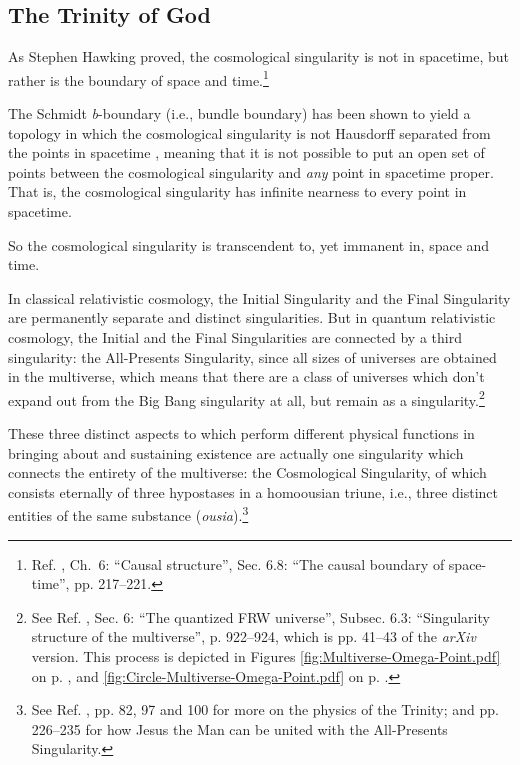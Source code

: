\documentclass[letterpaper,12pt]{article}
\begin{document}
\subsection{The Trinity of God}
\label{subsec:TrinityOfGod}

As Stephen Hawking proved, the cosmological singularity is not in spacetime, but rather is the boundary of space and time.\footnote{Ref. , Ch.~6: ``Causal structure'', Sec. 6.8: ``The causal boundary of space-time'', pp. 217--221.}

The Schmidt \emph{b}-boundary (i.e., bundle boundary) has been shown to yield a topology in which the cosmological singularity is not Hausdorff separated from the points in spacetime \cite{Bosshard1976,HajicekSchmidt1971,Johnson1977,Johnson1979,Schmidt1971,Schmidt1973,Schmidt1977,Schmidt1979}, meaning that it is not possible to put an open set of points between the cosmological singularity and \emph{any} point in spacetime proper. That is, the cosmological singularity has infinite nearness to every point in spacetime.

So the cosmological singularity is transcendent to, yet immanent in, space and time.

In classical relativistic cosmology, the Initial Singularity and the Final Singularity are permanently separate and distinct singularities. But in quantum relativistic cosmology, the Initial and the Final Singularities are connected by a third singularity: the All-Presents Singularity, since all sizes of universes are obtained in the multiverse, which means that there are a class of universes which don't expand out from the Big Bang singularity at all, but remain as a singularity.\footnote{See Ref. , Sec. 6: ``The quantized FRW universe'', Subsec. 6.3: ``Singularity structure of the multiverse'', p. 922--924, which is pp. 41--43 of the \emph{arXiv} version. This process is depicted in Figures \ref{fig:Multiverse-Omega-Point.pdf} on p. \pageref{fig:Multiverse-Omega-Point.pdf}, and \ref{fig:Circle-Multiverse-Omega-Point.pdf} on p. \pageref{fig:Circle-Multiverse-Omega-Point.pdf}.}

These three distinct aspects to which perform different physical functions in bringing about and sustaining existence are actually one singularity which connects the entirety of the multiverse: the Cosmological Singularity, of which consists eternally of three hypostases in a homoousian triune, i.e., three distinct entities of the same substance (\emph{ousia}).\footnote{See Ref. , pp. 82, 97 and 100 for more on the physics of the Trinity; and pp. 226--235 for how Jesus the Man can be united with the All-Presents Singularity.}
\end{document}
